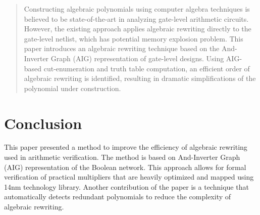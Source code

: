 \documentclass[journal, 10pt]{IEEEtran}
\begin{document}
\begin{abstract}
Constructing algebraic polynomials using computer algebra techniques is believed to be state-of-the-art in analyzing gate-level arithmetic circuits. However, the existing approach applies algebraic rewriting directly to the gate-level netlist, which has potential memory explosion problem. This paper introduces an algebraic rewriting technique based on the And-Inverter Graph (AIG) representation of gate-level designs. Using AIG-based cut-enumeration and truth table computation, an efficient order of algebraic rewriting is identified, resulting in dramatic simplifications of the polynomial under construction. %
\end{abstract}






\maketitle

\IEEEdisplaynontitleabstractindextext

\IEEEpeerreviewmaketitle

\vspace{-3mm}

\section{Conclusion}
This paper presented a method to improve the efficiency of algebraic rewriting used in arithmetic verification. The method is based on And-Inverter Graph (AIG) representation of the Boolean network. This approach allows for formal verification of practical multipliers that are heavily optimized and mapped using 14nm technology library. Another contribution of the paper is a technique that automatically detects redundant polynomials to reduce the complexity of algebraic rewriting.
\end{document}
